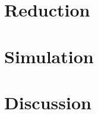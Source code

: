\documentclass[12pt,english]{article}\usepackage[]{graphicx}\usepackage{xcolor}
\begin{document}
\subsection{}


\section{Reduction}


\section{Simulation}


\section{Discussion}



\end{document}
